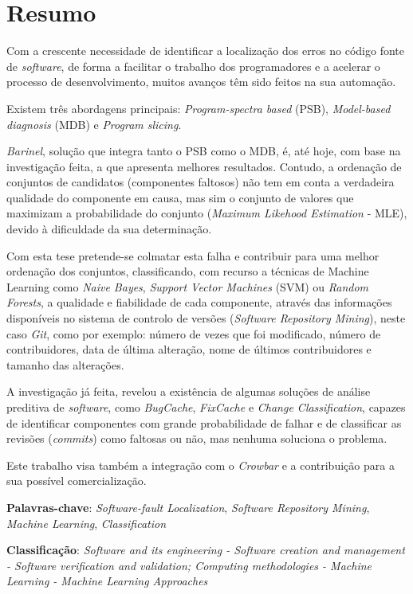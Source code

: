 \chapter*{Resumo}

Com a crescente necessidade de identificar a localização dos erros no código fonte de \emph{software}, de forma a facilitar o trabalho dos programadores e a acelerar o processo de desenvolvimento, muitos avanços têm sido feitos na sua automação.

Existem três abordagens principais: \emph{Program-spectra based} (PSB), \emph{Model-based diagnosis} (MDB) e \emph{Program slicing}.

\emph{Barinel}, solução que integra tanto o PSB como o MDB, é, até hoje, com base na investigação feita, a que apresenta melhores resultados. Contudo, a ordenação de conjuntos de candidatos (componentes faltosos) não tem em conta a verdadeira qualidade do componente em causa, mas sim o conjunto de valores que maximizam a probabilidade do conjunto (\emph{Maximum Likehood Estimation} - MLE), devido à dificuldade da sua determinação.

Com esta tese pretende-se colmatar esta falha e contribuir para uma melhor ordenação dos conjuntos, classificando, com recurso a técnicas de Machine Learning como \emph{Naive Bayes}, \emph{Support Vector Machines} (SVM) ou \emph{Random Forests}, a qualidade e fiabilidade de cada componente, através das informações disponíveis no sistema de controlo de versões (\emph{Software Repository Mining}), neste caso \emph{Git}, como por exemplo: número de vezes que foi modificado, número de contribuidores, data de última alteração, nome de últimos contribuidores e tamanho das alterações.

A investigação já feita, revelou a existência de algumas soluções de análise preditiva de \emph{software}, como \emph{BugCache}, \emph{FixCache} e \emph{Change Classification}, capazes de identificar componentes com grande probabilidade de falhar e de classificar as revisões (\emph{commits}) como faltosas ou não, mas nenhuma soluciona o problema.

Este trabalho visa também a integração com o \emph{Crowbar} e a contribuição para a sua possível comercialização.

\vspace*{10mm}\noindent

\textbf{Palavras-chave}: \emph{Software-fault Localization}, \emph{Software Repository Mining}, \emph{Machine Learning}, \emph{Classification}

\vspace*{5mm}\noindent

\textbf{Classificação}: \emph{Software and its engineering - Software creation and management - Software verification and validation; Computing methodologies - Machine Learning - Machine Learning Approaches}